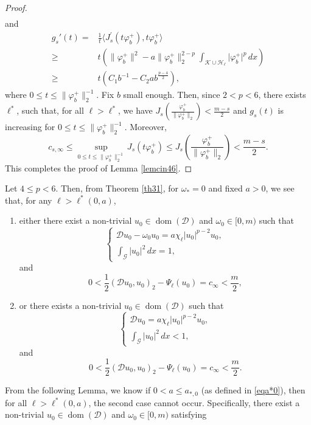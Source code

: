 \documentclass[11pt]{amsart}
\newcommand{\abs}[1]{\lvert#1\rvert}
\newcommand{\norm}[1]{\lVert#1\rVert}
\newcommand{\D}{\mathcal{D}}
\newcommand{\G}{\mathcal{G}}
\newcommand{\K}{\mathcal{K}}
\numberwithin{equation}{section}
\begin{document}
\begin{proof}
\begin{equation*}
\begin{aligned}
    \end{aligned}
    \end{equation*}
and
$$
\begin{aligned}
g_s'(t)  =&\frac{1}{t}\langle J_s^{\prime}(t\varphi_b^+), t\varphi_b^+\rangle \\
 \geq& t\left(\norm{\varphi_b^+}^2-a\norm{\varphi_b^+}_{2}^{2-p}\int_{\K\cup\mathcal{H}_\ell} \abs{\varphi_b^+}^{p} \,dx\right)\\
 \geq& t(C_1b^{-1} - C_2ab^\frac{p-4}{2}),
\end{aligned}
$$
where $0 \leq t \leq \norm{\varphi_b^+}_{2}^{-1}$. Fix $b$ small enough. Then, since $2< p <6$, there exists $\ell^*$, such that, for all $\ell>\ell^*$, we have $J_s(\frac{\varphi_b^+}{\norm{\varphi_b^+}_2}) < \frac{m-s}{2}$ and $g_s(t)$ is increasing for $0 \leq t \leq\norm{\varphi_b^+}_{2} ^{-1}$. Moreover,
$$
c_{s,\infty} \leq \sup _{0 \leq t \leq\norm{\varphi_b^+}_{2} ^{-1}} J_s(t\varphi_b^+) \leq J_s(\frac{\varphi_b^+}{\norm{\varphi_b^+}_2}) < \frac{m-s}{2}.
$$
This completes the proof of Lemma \ref{lemcin46}.
\end{proof}
Let $4 \leq p <6$. Then, from Theorem \ref{th31}, for $\omega_*=0$ and fixed $a > 0$, we see that, for any $\ell > \ell^*(0,a)$,\\
\begin{enumerate}[label=\rm(\roman*)]
\item either there exist a non-trivial $u_{0} \in \operatorname{dom}(\D)$ and $\omega_{0} \in[0, m)$ such that
$$
\left\{\begin{array}{l}
\D u_{0}-\omega_{0} u_{0}=a\chi_{\ell}\abs{u_{0}}^{p-2} u_{0},\\
\int_{\G}\left|u_{0}\right|^{2} \,dx = 1,
\end{array}\right.
$$
and
$$
0<\frac{1}{2}(\D u_{0}, u_{0})_{2}-\Psi_\ell(u_{0})=c_{\infty}<\frac{m}{2},
$$
\item or there exists a non-trivial $u_{0} \in \operatorname{dom}(\D)$ such that
$$
\left\{\begin{array}{l}
\D u_{0}=a\chi_{\ell}\abs{u_{0}}^{p-2} u_{0}, \\
\int_{\G}\left|u_{0}\right|^{2} \,dx < 1,
\end{array}\right.
$$
and
$$
0<\frac{1}{2}(\D u_{0}, u_{0})_{2}-\Psi_\ell(u_{0})=c_{\infty}<\frac{m}{2}.
$$
\end{enumerate}
 From the following Lemma, we know if $0<a \leq a_{*,0}$ (as defined in \eqref{eqa*0}), then for all $\ell > \ell^*(0,a)$, the second case cannot occur. Specifically, there exist a non-trivial $u_{0} \in \operatorname{dom}(\D)$ and $\omega_{0} \in[0, m)$ satisfying
\end{document}
